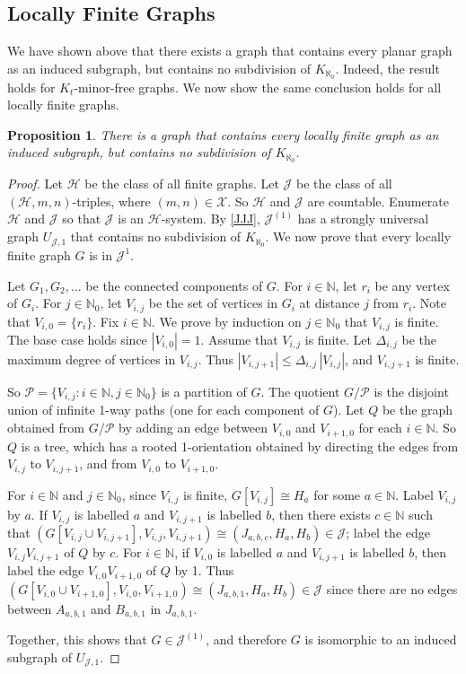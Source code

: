 \documentclass[a4paper,11pt]{article}
\theoremstyle{plain}
\newtheorem{prop}[thm]{Proposition}
\theoremstyle{definition}
\renewcommand{\leq}{\leqslant}
\newcommand{\XX}{\mathcal{X}}
\newcommand{\HH}{\mathcal{H}}
\newcommand{\JJ}{\mathcal{J}}
\newcommand{\NN}{\mathbb{N}}
\newcommand{\PART}{\mathcal{P}}
\begin{document}
\subsection{Locally Finite Graphs}
\label{LocallyFiniteGraphs}

We have shown above that there exists a graph that contains every planar graph as an induced subgraph, but contains no subdivision of $K_{\aleph_0}$. Indeed, the result holds for $K_t$-minor-free graphs. We now show the same conclusion holds for all locally finite graphs.

\begin{prop}
\label{StronglyUniversalLocallyFinite}
There is a graph that contains every locally finite graph as an induced subgraph, but contains no subdivision of $K_{\aleph_0}$. 
\end{prop}

\begin{proof}
Let $\HH$ be the class of all finite graphs. Let $\JJ$ be the class of all $(\HH,m,n)$-triples, where $(m,n)\in\XX$. So $\HH$ and $\JJ$ are countable. Enumerate $\HH$ and $\JJ$ so that $\JJ$ is an $\HH$-system. By \cref{JJJ}, $\JJ^{(1)}$ has a strongly universal graph $U_{\JJ,1}$ that contains no subdivision of $K_{\aleph_0}$. We now prove that every locally finite graph $G$ is in $\JJ^{1}$. 

Let $G_1,G_2,\dots$ be the connected components of $G$. For $i\in\NN$, let $r_i$ be any vertex of $G_i$. For $j\in\NN_0$, let $V_{i,j}$ be the set of vertices in $G_i$ at distance $j$ from $r_i$. Note that $V_{i,0}=\{r_i\}$. Fix $i\in\NN$. We prove by induction on $j\in\NN_0$ that $V_{i,j}$ is finite. The base case holds since $|V_{i,0}|=1$. Assume that $V_{i,j}$ is finite. Let $\Delta_{i,j}$ be the maximum degree of vertices in $V_{i,j}$. Thus $|V_{i,j+1}|\leq \Delta_{i,j}\,|V_{i,j}|$, and $V_{i,j+1}$ is finite. 

So $\PART=\{V_{i,j}:i\in\NN,j\in\NN_0\}$ is a partition of $G$. The quotient $G/\PART$ is the disjoint union of infinite 1-way paths (one for each component of $G$). Let $Q$ be the graph obtained from $G/\PART$ by adding an edge between $V_{i,0}$ and $V_{i+1,0}$ for each $i\in\NN$. So $Q$ is a tree, which has a rooted 1-orientation obtained by directing the edges from $V_{i,j}$ to $V_{i,j+1}$, and from $V_{i,0}$ to $V_{i+1,0}$. 

For $i\in\NN$ and $j\in\NN_0$, since $V_{i,j}$ is finite, $G[V_{i,j}]\cong H_a$ for some $a\in\NN$. Label $V_{i,j}$ by $a$. If $V_{i,j}$ is labelled $a$ and $V_{i,j+1}$ is labelled $b$, then there exists $c\in\NN$ such that $(G[V_{i,j}\cup V_{i,j+1}],V_{i,j},V_{i,j+1})\cong(J_{a,b,c},H_a,H_b)\in \JJ$; label the edge $V_{i,j}V_{i,j+1}$ of $Q$ by $c$. For $i\in\NN$, if $V_{i,0}$ is labelled $a$ and $V_{i,j+1}$ is labelled $b$, then label the edge $V_{i,0}V_{i+1,0}$ of $Q$ by 1. Thus $(G[V_{i,0}\cup V_{i+1,0}],V_{i,0},V_{i+1,0})\cong(J_{a,b,1},H_a,H_b)\in \JJ$ since there are no edges between $A_{a,b,1}$ and $B_{a,b,1}$ in $J_{a,b,1}$. 

Together, this shows that $G\in\JJ^{(1)}$, and therefore $G$ is isomorphic to an induced subgraph of $U_{\JJ,1}$. 
\end{proof}
\end{document}
